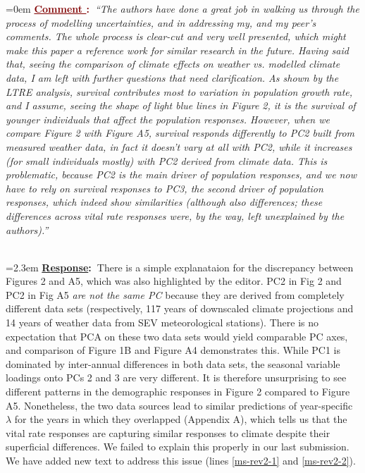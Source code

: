 \documentclass[12pt]{article}
\newcounter{cN}
\newcommand{\comment}[1]{
	\vspace{2em}
	\refstepcounter{cN} %
	\noindent \hangindent=0em \textbf{\textcolor{Maroon}{\uline{Comment \thecN}:~}}\emph{``#1''}
	}
\newcommand{\response}[1]{
	\\[0.25em]
	\hangindent=2.3em \textbf{\textcolor{NavyBlue}{\uline{Response}:~}}#1
	}
\begin{document}
\comment{The authors have done a great job in walking us through the process of modelling uncertainties, and in addressing my, and my peer's comments. The whole process is clear-cut and very well presented, which might make this paper a reference work for similar research in the future.
Having said that, seeing the comparison of climate effects on weather vs. modelled climate data, I am left with further questions that need clarification. As shown by the LTRE analysis, survival contributes most to variation in population growth rate, and I assume, seeing the shape of light blue lines in Figure 2, it is the survival of younger individuals that affect the population responses. However, when we compare Figure 2 with Figure A5, survival responds differently to PC2 built from measured weather data, in fact it doesn't vary at all with PC2, while it increases (for small individuals mostly) with PC2 derived from climate data. This is problematic, because PC2 is the main driver of population responses, and we now have to rely on survival responses to PC3, the second driver of population responses, which indeed show similarities (although also differences; these differences across vital rate responses were, by the way, left unexplained by the authors).}
\response{There is a simple explanataion for the discrepancy between Figures 2 and A5, which was also highlighted by the editor. 
PC2 in Fig 2 and PC2 in Fig A5 \textit{are not the same PC} because they are derived from completely different data sets (respectively, 117 years of downscaled climate projections and 14 years of weather data from SEV meteorological stations).
There is no expectation that PCA on these two data sets would yield comparable PC axes, and comparison of Figure 1B and Figure A4 demonstrates this. 
While PC1 is dominated by inter-annual differences in both data sets, the seasonal variable loadings onto PCs 2 and 3 are very different. 
It is therefore unsurprising to see different patterns in the demographic responses in Figure 2 compared to Figure A5. 
Nonetheless, the two data sources lead to similar predictions of year-specific $\lambda$ for the years in which they overlapped (Appendix A), which tells us that the vital rate responses are capturing similar responses to climate despite their superficial differences. 
We failed to explain this properly in our last submission. 
We have added new text to address this issue (lines \ref{ms-rev2-1} and \ref{ms-rev2-2}).
}
\end{document}
